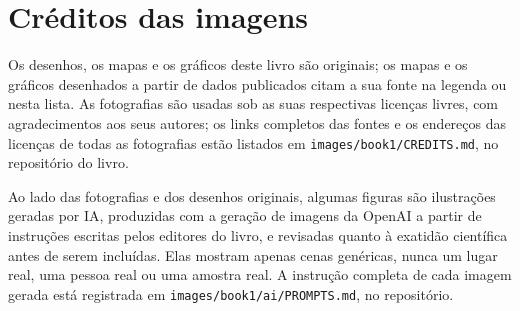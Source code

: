 \chapter*{Créditos das imagens}

Os desenhos, os mapas e os gráficos deste livro são originais; os mapas e
os gráficos desenhados a partir de dados publicados citam a sua fonte na
legenda ou nesta lista. As fotografias são usadas sob as suas respectivas
licenças livres, com agradecimentos aos seus autores; os links completos
das fontes e os endereços das licenças de todas as fotografias estão
listados em \texttt{images/book1/CREDITS.md}, no repositório do livro.

\bigskip
Ao lado das fotografias e dos desenhos originais, algumas figuras são
ilustrações geradas por IA, produzidas com a geração de imagens da OpenAI
a partir de instruções escritas pelos editores do livro, e revisadas
quanto à exatidão científica antes de serem incluídas. Elas mostram
apenas cenas genéricas, nunca um lugar real, uma pessoa real ou uma
amostra real. A instrução completa de cada imagem gerada está registrada
em \texttt{images/book1/ai/PROMPTS.md}, no repositório.

